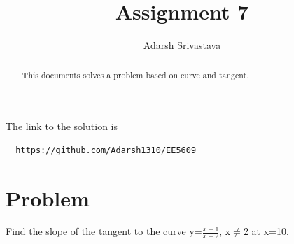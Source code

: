 \documentclass[journal,12pt,twocolumn]{IEEEtran}
\begin{document}
      \def\rightbox#1{\makebox[0in][r]{#1}}
      \def\centbox#1{\makebox[0in]{#1}}
      \def\topbox#1{\raisebox{-\baselineskip}[0in][0in]{#1}}
      \def\midbox#1{\raisebox{-0.5\baselineskip}[0in][0in]{#1}}
 \vspace{3cm}
 \title{Assignment 7}
 \author{Adarsh Srivastava}
 \maketitle
 \newpage
 \bigskip
 \renewcommand{\thetable}{\theenumi}
 The link to the solution is
 \begin{lstlisting}
  https://github.com/Adarsh1310/EE5609
 \end{lstlisting}
 \begin{abstract}
 This documents solves a problem based on curve and tangent.
 \end{abstract}
  \section{\textbf{Problem}}
Find the slope of the tangent to the curve y=$\frac{x-1}{x-2}$, x$\not=$2 at x=10.
\end{document}
